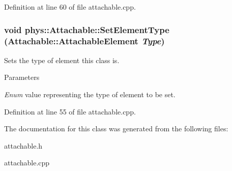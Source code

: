 Definition at line 60 of file attachable.cpp.

\hypertarget{classphys_1_1Attachable_a74361315eba9e4f0ce288518c92541fa}{
\subsubsection[{SetElementType}]{\setlength{\rightskip}{0pt plus 5cm}void phys::Attachable::SetElementType (Attachable::AttachableElement {\em Type})}}
\label{df/dbd/classphys_1_1Attachable_a74361315eba9e4f0ce288518c92541fa}


Sets the type of element this class is. 


\begin{DoxyParams}{Parameters}
\item[{\em Enum}]value representing the type of element to be set. \end{DoxyParams}


Definition at line 55 of file attachable.cpp.



The documentation for this class was generated from the following files:\begin{DoxyCompactItemize}
\item 
attachable.h\item 
attachable.cpp\end{DoxyCompactItemize}
